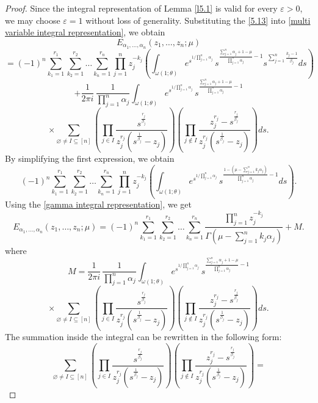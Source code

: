 \documentclass[12pt, reqno]{amsart}
\theoremstyle{definition}
\theoremstyle{remark}
\numberwithin{equation}{section}
\begin{document}
\begin{proof}
Since the integral representation of Lemma \ref{l5.1} is valid for every $\varepsilon>0$, we may choose $\varepsilon=1$ without loss of generality. Substituting the \eqref{5.13} into \eqref{multi variable integral representation}, we obtain
  $$E_{\alpha_1, \dots, \alpha_n }(z_1, \dots, z_n;\mu)$$
  $$=(-1)^n\sum_{k_1=1}^{r_{1}}
\sum_{k_2=1}^{r_{2}}\dots
\sum_{k_n=1}^{r_{n}}
\prod_{j=1}^nz_j^{-k_j}
\left(\int_{\omega(1;\theta)}
e^{s^{1/\prod\limits_{{j=1}}^n\alpha_j}}
\,s^{\frac{\sum\limits_{j=1}^n\alpha_j+1-\mu}{\prod\limits_{j=1}^n\alpha_j}-1}s^{\sum\limits_{j=1}^n\frac{k_j-1}{\beta_j}}ds\right)$$
$$
+\frac{1}{2\pi i}\,
\frac{1}{\prod\limits_{{j=1}}^n\alpha_j}\int_{\omega(1;\theta)}
e^{s^{1/\prod\limits_{{j=1}}^n\alpha_j}}
\,s^{\frac{\sum\limits_{j=1}^n\alpha_j+1-\mu}{\prod\limits_{j=1}^n\alpha_j}-1}$$$$\times\sum_{\varnothing\neq I\subseteq[n]}
\left(
\prod_{j\in I}\frac{s^{\frac{r_j}{\beta_j}}}
{z_j^{r_j}\left(s^{\frac{1}{\beta_j}}-z_j\right)}
\right)
\left(
\prod_{j\notin I}\frac{z_j^{r_j}-s^{\frac{r_j}{\beta_j}}}
{z_j^{r_j}\left(s^{\frac{1}{\beta_j}}-z_j\right)}
\right)ds.
$$
By simplifying the first expression, we obtain
$$(-1)^n\sum_{k_1=1}^{r_{1}}
\sum_{k_2=1}^{r_{2}}\dots
\sum_{k_n=1}^{r_{n}}
\prod_{j=1}^nz_j^{-k_j}
\left(\int_{\omega(1;\theta)}
e^{s^{1/\prod\limits_{{j=1}}^n\alpha_j}}
\,s^{\frac{1-\left(\mu-\sum\limits_{j=1}^nk_j\alpha_j\right)}{\prod\limits_{j=1}^n\alpha_j}-1}ds\right).$$
Using the \eqref{gamma integral representation}, we get
$$E_{\alpha_1, \dots, \alpha_n }(z_1, \dots, z_n;\mu)
=(-1)^n\sum_{k_1=1}^{r_{1}}
\sum_{k_2=1}^{r_{2}}\dots
\sum_{k_n=1}^{r_{n}}
\frac{\prod\limits_{j=1}^nz_j^{-k_j}}{\Gamma\left(\mu-\sum\limits_{j=1}^nk_j\alpha_j\right)}+M.$$
where
$$M=\frac{1}{2\pi i}\,
\frac{1}{\prod\limits_{{j=1}}^n\alpha_j}\int_{\omega(1;\theta)}
e^{s^{1/\prod\limits_{{j=1}}^n\alpha_j}}
\,s^{\frac{\sum\limits_{j=1}^n\alpha_j+1-\mu}{\prod\limits_{j=1}^n\alpha_j}-1}$$
$$\times\sum_{\varnothing\neq I\subseteq[n]}
\left(
\prod_{j\in I}\frac{s^{\frac{r_j}{\beta_j}}}
{z_j^{r_j}\left(s^{\frac{1}{\beta_j}}-z_j\right)}
\right)
\left(
\prod_{j\notin I}\frac{z_j^{r_j}-s^{\frac{r_j}{\beta_j}}}
{z_j^{r_j}\left(s^{\frac{1}{\beta_j}}-z_j\right)}
\right)ds.$$
The summation inside the integral can be rewritten in the following form:
$$\sum_{\varnothing\neq I\subseteq[n]}
\left(
\prod_{j\in I}\frac{s^{\frac{r_j}{\beta_j}}}
{z_j^{r_j}\left(s^{\frac{1}{\beta_j}}-z_j\right)}
\right)
\left(
\prod_{j\notin I}\frac{z_j^{r_j}-s^{\frac{r_j}{\beta_j}}}
{z_j^{r_j}\left(s^{\frac{1}{\beta_j}}-z_j\right)}
\right)=$$
\begin{equation}\label{5.18}

\end{equation}
\end{proof}
\end{document}
